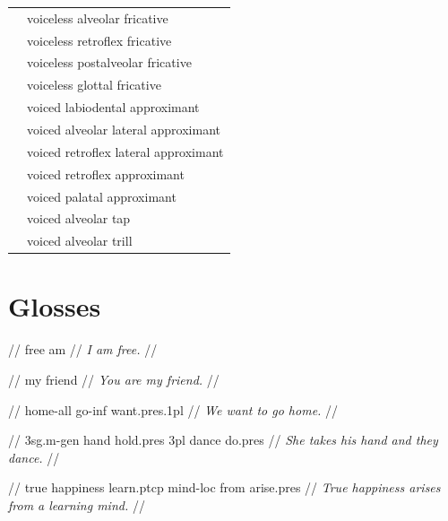 \documentclass{article}
\begin{document}
\begin{xltabular}{\textwidth}{lL}
   & voiceless alveolar fricative \\
   & voiceless retroflex fricative \\
   & voiceless postalveolar fricative \\
   & voiceless glottal fricative \\
   & voiced labiodental approximant \\
   & voiced alveolar lateral approximant \\
   & voiced retroflex lateral approximant \\
   & voiced retroflex approximant \\
   & voiced palatal approximant \\
   & voiced alveolar tap \\
   & voiced alveolar trill \\
\end{xltabular}

\newpage\section{Glosses}

\ex
\begingl
\gla {}   //
 free am //
\glft \textit{I am free.} //
\endgl
\xe

\ex
\begingl
\gla {}   //
 my friend //
\glft \textit{You are my friend.} //
\endgl
\xe

\ex
\begingl
\gla {}    //
 home-{\sc all} go-{\sc inf} want.{\sc pres.1pl} //
\glft \textit{We want to go home.} //
\endgl
\xe

\ex
\begingl
\gla {}       //
 {\sc 3sg.m}-{\sc gen} hand hold.{\sc pres} {\sc 3pl} dance do.{\sc pres} //
\glft \textit{She takes his hand and they dance.} //
\endgl
\xe

\ex
\begingl
\gla {}      //
\glb true happiness learn.{\sc ptcp} mind-{\sc loc} from arise.{\sc pres} //
\glft \textit{True happiness arises from a learning mind.} //
\endgl
\xe
\end{document}
